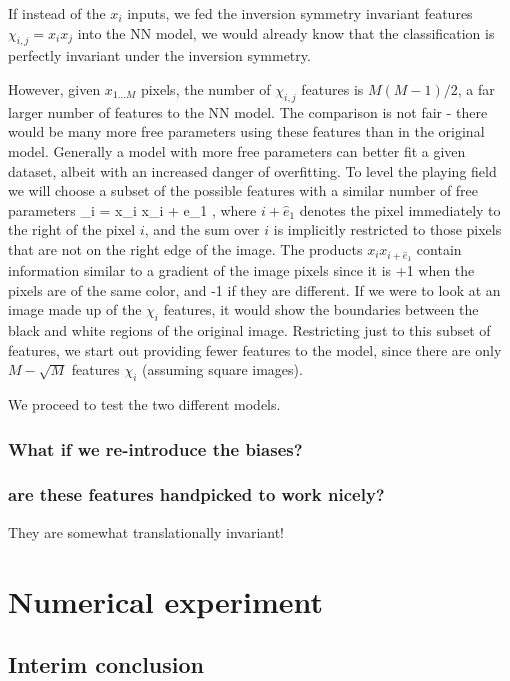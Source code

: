 \documentclass[twocolumn, prl]{revtex4-1}
\begin{document}
If instead of the $x_i$ inputs, we fed the inversion symmetry invariant features $\chi_{i,j} = x_i x_j$ into the NN model, we would already know that the classification is perfectly invariant under the inversion symmetry.

However, given $x_{1 \ldots M}$ pixels, the number of $\chi_{i,j}$ features is $M(M-1)/2$, a far larger number of features to the NN model. The comparison is not fair - there would be many more free parameters using these features than in the original model. Generally a model with more free parameters can better fit a given dataset, albeit with an increased danger of overfitting.
To level the playing field we will choose a subset of the possible features with a similar number of free parameters
\be
\chi_i =  x_i x_{i + {\hat e}_1}
\; ,
\ee
where $i + {\hat e}_1$ denotes the pixel immediately to the right of the pixel $i$, and the sum over $i$ is implicitly restricted to those pixels that are not on the right edge of the image. The products $x_i x_{i + {\hat e}_1}$ contain information similar to a gradient of the image pixels since it is +1 when the pixels are of the same color, and -1 if they are different. If we were to look at an image made up of the $\chi_i$ features, it would show the boundaries between the black and white regions of the original image. Restricting just to this subset of features, we start out providing fewer features to the model, since there are only $M - \sqrt{M}$  features $\chi_i$ (assuming square images).

We proceed to test the two different models.

\subsubsection{What if we re-introduce the biases?}

\subsubsection{are these features handpicked to work nicely?}

They are somewhat translationally invariant!

\section{Numerical experiment}
\label{Sec:experiments}


\subsection{Interim conclusion}
\end{document}
